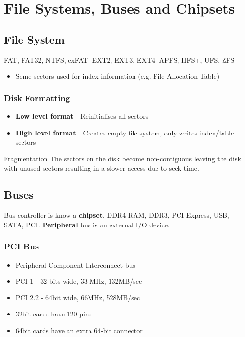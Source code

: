 \section{File Systems, Buses and Chipsets}
\subsection{File System}
FAT, FAT32, NTFS, exFAT, EXT2, EXT3, EXT4, APFS, HFS+, UFS, ZFS
\begin{itemize}
	\item Some sectors used for index information (e.g. File Allocation Table)	
\end{itemize}
\subsubsection{Disk Formatting}
\begin{itemize}
	\item\textbf{Low level format} - Reinitialises all sectors
	\item\textbf{High level format} - Creates empty file system, only writes index/table sectors	
\end{itemize}

\begin{note}{Fragmentation}
	The sectors on the disk become non-contiguous leaving the disk with unused sectors resulting in a slower access due to seek time.	
\end{note}

\subsection{Buses}
Bus controller is know a \textbf{chipset}. DDR4-RAM, DDR3, PCI Express, USB, SATA, PCI. \textbf{Peripheral} bus is an external I/O device.

\subsubsection{PCI Bus}
\begin{itemize}
	\item Peripheral Component Interconnect bus
	\item PCI 1 - 32 bits wide, 33 MHz, 132MB/sec
	\item PCI 2.2 - 64bit wide, 66MHz, 528MB/sec
	\item 32bit cards have 120 pins
	\item 64bit cards have an extra 64-bit connector	
\end{itemize}




